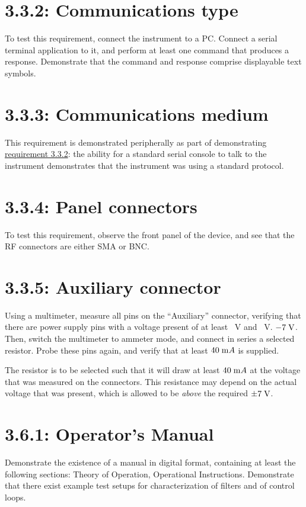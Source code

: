 \section*{3.3.2: Communications type}
\label{tp:3.3.2}
To test this requirement, connect the instrument to a PC. Connect a serial terminal application
to it, and perform at least one command that produces a response. Demonstrate that the
command and response comprise displayable text symbols.

\section*{3.3.3: Communications medium}
This requirement is demonstrated peripherally as part of demonstrating
\hyperref[tp:3.3.2]{requirement 3.3.2}: the ability for a standard serial console
to talk to the instrument demonstrates that the instrument was using a standard
protocol.

\section*{3.3.4: Panel connectors}
To test this requirement, observe the front panel of the device, and see that the RF connectors are either
SMA or BNC.

\section*{3.3.5: Auxiliary connector}
Using a multimeter, measure all pins on the ``Auxiliary'' connector, verifying that there are
power supply pins with a voltage present of at least ~V and ~V.
$-7\;\mathrm{V}$. Then, switch the multimeter to ammeter mode, and connect in series a selected resistor. Probe
these pins again, and verify that at least $40\;\mathrm{m}A$ is supplied.

The resistor is to be selected such that it will draw at least $40\;\mathrm{m}A$ at the voltage that was
measured on the connectors. This resistance may depend on the actual voltage that was present,
which is allowed to be \emph{above} the required $\pm 7\;\mathrm{V}$.

\section*{3.6.1: Operator's Manual}
Demonstrate the existence of a manual in digital format, containing at least the following
sections: Theory of Operation, Operational Instructions. Demonstrate that there exist example
test setups for characterization of filters and of control loops.

